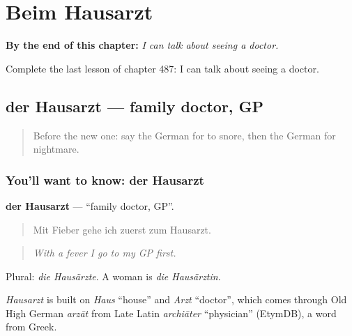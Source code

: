 
\chapter{Beim Hausarzt}
\label{ch:ge-beim-hausarzt}

\begin{chapteropening}
\textbf{By the end of this chapter:} \emph{I can talk about seeing a doctor.}

Complete the last lesson of chapter 487: I can talk about seeing a doctor.
\end{chapteropening}

\section[der Hausarzt]{der Hausarzt — family doctor, GP}

\label{lesson:GE-C487-hausarzt}



\begin{quote}
Before the new one: say the German for to snore, then the German for nightmare.
\end{quote}

\subsection*{You'll want to know: der Hausarzt}
\textbf{der Hausarzt} — \textquotedblleft{}family doctor, GP\textquotedblright{}.

\begin{quote}
Mit Fieber gehe ich zuerst zum Hausarzt.
\end{quote}

\begin{quote}
\emph{With a fever I go to my GP first.}
\end{quote}

Plural: \emph{die Hausärzte}. A woman is \emph{die Hausärztin}.

\begin{cousinweb}
\emph{Hausarzt} is built on \emph{Haus} \textquotedblleft{}house\textquotedblright{} and \emph{Arzt} \textquotedblleft{}doctor\textquotedblright{}, which comes through Old High German \emph{arzāt} from Late Latin \emph{archiāter} \textquotedblleft{}physician\textquotedblright{} (EtymDB), a word from Greek.
\end{cousinweb}


